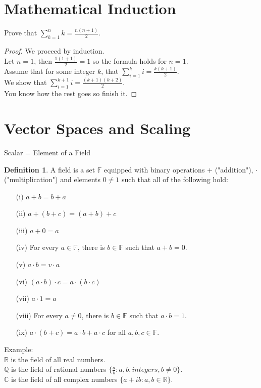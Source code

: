 \documentclass{report}
\theoremstyle{plain}
\theoremstyle{definition}
\newtheorem*{defn}{Definition}
\theoremstyle{plain}
\begin{document}
\section{Mathematical Induction}
Prove that $\sum_{k=1}^{n}k = \frac{n(n+1)}{2}$.
\begin{proof}
We proceed by induction.\\
Let $n=1$, then $\frac{1(1+1)}{2} = 1$ so the formula holds for $n=1$.\\
Assume that for some integer $k$, that $\sum_{i=1}^{k}i = \frac{k(k+1)}{2}$.\\
We show that $\sum_{i=1}^{k+1}i = \frac{(k+1)(k+2)}{2}$.\\
You know how the rest goes so finish it.
\end{proof}

\section{Vector Spaces and Scaling}
Scalar = Element of a Field\\
\begin{defn} A field is a set $\mathbb{F}$ equipped with binary operations $+$ ("addition"), $\cdot$ ("multiplication") and elements $0 \neq 1$ such that all of the following hold:
\begin{enumerate}
	\item[(i)] $a+b=b+a$
	\item[(ii)] $a+(b+c)=(a+b)+c$
	\item[(iii)] $a+0=a$
	\item[(iv)] For every $a \in \mathbb{F}$, there is $b \in \mathbb{F}$ such that $a+b=0$.
	\item[(v)] $a \cdot b = v \cdot a$
	\item[(vi)] $(a \cdot b) \cdot c = a \cdot (b \cdot c)$
	\item[(vii)] $a \cdot 1 = a$
	\item[(viii)] For every $a \neq 0$, there is $b \in \mathbb{F}$ such that $a \cdot b = 1$.
	\item[(ix)] $a \cdot (b + c) = a \cdot b + a \cdot c$ for all $a, b, c \in \mathbb{F}$.
\end{enumerate}
\end{defn}
Example:\\
$\mathbb{R}$ is the field of all real numbers.\\
$\mathbb{Q}$ is the field of rational numbers $\{\frac{a}{b}: a,b,integers,b \neq 0\}$.\\
$\mathbb{C}$ is the field of all complex numbers $\{a+ib: a,b\in \mathbb{R}\}$.
\end{document}
